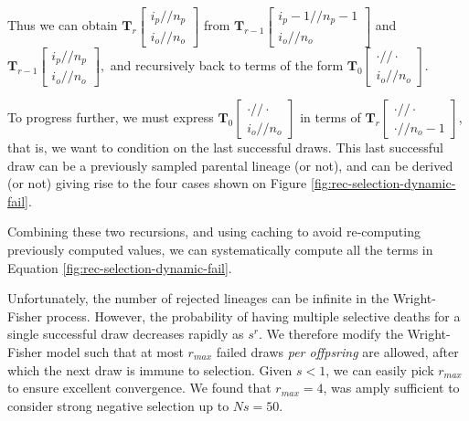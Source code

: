 \documentclass[review]{elsarticle}
\newcommand{\dslash}{/\!\!/}
\newcommand{\Coalc}[4]{\begin{bmatrix}#1\dslash #2 \\ #3\dslash #4 \end{bmatrix}}
\begin{document}
Thus we can obtain $\mathbf{T}_{r}\Coalc{i_p}{n_p}{i_o}{n_o}$ from
$\mathbf{T}_{r-1}\Coalc{i_p-1}{n_p-1}{i_o}{n_o}$ and $\mathbf{T}_{r-1}\Coalc{i_p}{n_p}{i_o}{n_o},$
and recursively back to terms of the form $\mathbf{T}_{0}\Coalc{\cdot}{\cdot}{i_o}{n_o}$.
  
To progress further, we must express $\mathbf{T}_{0}\Coalc{\cdot}{\cdot}{i_o}{n_o}$ in terms of
$\mathbf{T}_{r}\Coalc{\cdot}{\cdot}{\cdot}{n_o-1}$, that is, we want to condition on the last
successful draws. This last successful draw can be a previously sampled parental lineage (or not),
and can be derived (or not) giving rise to the four cases shown on Figure
\ref{fig:rec-selection-dynamic-fail}.
  
Combining these two recursions, and using caching to avoid re-computing previously computed values,
we can systematically compute all the terms in Equation \ref{fig:rec-selection-dynamic-fail}.

Unfortunately, the number of rejected lineages can be infinite in the Wright-Fisher process.
However, the probability of having multiple selective deaths for a single successful draw decreases
rapidly as $s^r.$ We therefore modify the Wright-Fisher model such that at most $r_{max}$ failed
draws \emph{per offpsring} are allowed, after which the next draw is immune to selection. Given
$s<1$, we can easily pick $r_{max}$ to ensure excellent convergence. We found that $r_{max}=4$, was
amply sufficient to consider strong negative selection up to $Ns=50$.
\end{document}

